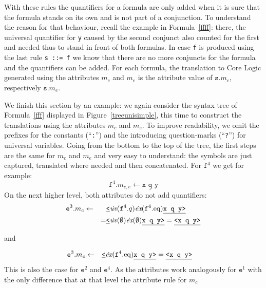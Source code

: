 With these rules the quantifiers for a formula are only added when it is sure that the formula stands on its own and is not part of a conjunction. To understand the reason for
that behaviour, recall the example in Formula~\ref{ffff}: there, the universal quantifier for \texttt{y} caused by the second conjunct also counted for the first and needed thus to stand in
front of both formulas. In case \texttt{f} is produced using the last rule \texttt{s~::=~f} we know that there are no more conjuncts for the formula and the quantifiers can be added.
For each formula, the translation to \nthree Core Logic generated using the attributes $m_c$ and $m_e$ is the attribute value of $\texttt{s}.m_c$, respectively $\texttt{s}.m_e$.

We finish this section by an example: we again consider the syntax tree of Formula~\ref{fff} displayed in Figure~\ref{treeunisimple}, this time to construct the translations
using the attributes $m_c$ and $m_e$. 
To improve readability, we omit  the prefixes for the constants (``\texttt{:}'') and the introducing question-marks (``\texttt{?}'') for universal variables.
Going from the bottom to the top of the tree, the first steps are the same for $m_c$ and $m_e$ and very easy to understand: the symbols are just captured, translated where needed and then concatenated.
For $\texttt{f}^4$ we get for example:
\[
 \texttt{f}^4.m_{c,e}\leftarrow \underline{\texttt{x q y}}
\]
On the next higher level, both attributes do not add quantifiers:
\begin{align*}
\notag& \texttt{e}^3.m_{c}\leftarrow& &\underline{\texttt{<}}\dot{\textit{uv}}(\texttt{f}^4.q)\dot{\textit{ex}}(\texttt{f}^4.\text{eq}) \underline{\texttt{x q y>}}\\
\notag&                             & =& \underline{\texttt{<}}\dot{\textit{uv}}(\emptyset)\dot{\textit{ex}}(\emptyset) \underline{\texttt{x q y>}}=\underline{\texttt{<x q y>}}
\end{align*}
\begin{center} and \end{center}
\begin{align*}
\notag& \texttt{e}^3.m_{e}\leftarrow& &\underline{\texttt{<}}\dot{\textit{ex}}(\texttt{f}^4.\text{eq}) \underline{\texttt{x q y>}}=\underline{\texttt{<x q y>}}
\end{align*}
This is also the case for $\texttt{e}^2$ and $\texttt{e}^4$. As the attributes work analogously for $\texttt{e}^1$ 
with the only difference that at that level the attribute rule for $m_c$
